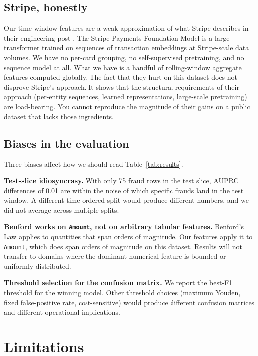 \documentclass{article}
\begin{document}
\subsection{Stripe, honestly}

Our time-window features are a weak approximation of what Stripe describes in their engineering post \cite{stripeflywheel2024}. The Stripe Payments Foundation Model is a large transformer trained on sequences of transaction embeddings at Stripe-scale data volumes. We have no per-card grouping, no self-supervised pretraining, and no sequence model at all. What we have is a handful of rolling-window aggregate features computed globally. The fact that they hurt on this dataset does not disprove Stripe's approach. It shows that the structural requirements of their approach (per-entity sequences, learned representations, large-scale pretraining) are load-bearing. You cannot reproduce the magnitude of their gains on a public dataset that lacks those ingredients.

\subsection{Biases in the evaluation}

Three biases affect how we should read Table~\ref{tab:results}.

\textbf{Test-slice idiosyncrasy.} With only 75 fraud rows in the test slice, AUPRC differences of 0.01 are within the noise of which specific frauds land in the test window. A different time-ordered split would produce different numbers, and we did not average across multiple splits.

\textbf{Benford works on \texttt{Amount}, not on arbitrary tabular features.} Benford's Law applies to quantities that span orders of magnitude. Our features apply it to \texttt{Amount}, which does span orders of magnitude on this dataset. Results will not transfer to domains where the dominant numerical feature is bounded or uniformly distributed.

\textbf{Threshold selection for the confusion matrix.} We report the best-F1 threshold for the winning model. Other threshold choices (maximum Youden, fixed false-positive rate, cost-sensitive) would produce different confusion matrices and different operational implications.

\section{Limitations}
\end{document}
